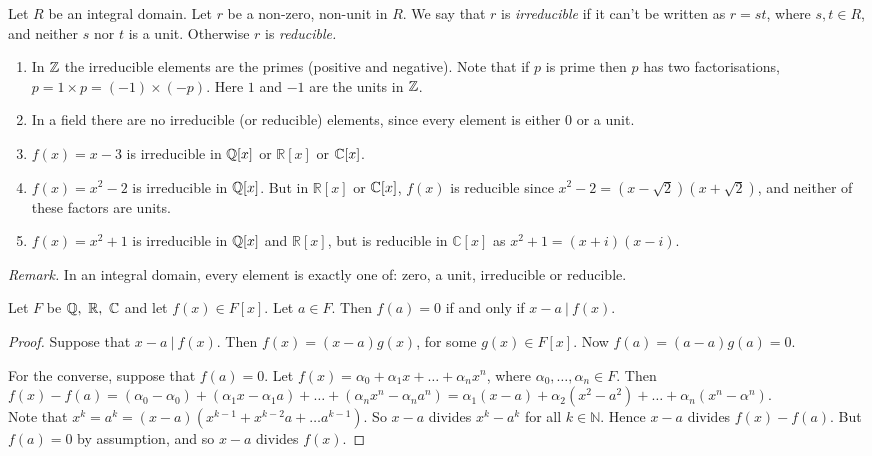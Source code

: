 \documentclass[10pt]{scrartcl}
\begin{document}
\begin{definition} Let $R$ be an integral domain. Let $r$ be a non-zero, non-unit in $R$. We say that $r$ is \emph{irreducible} if it can't be written as $r = st$, where $s,t \in R$, and neither $s$ nor $t$ is a unit. Otherwise $r$ is \emph{reducible.}	
\end{definition}
\vspace*{10pt}

\begin{examples}\begin{enumerate}
 \item In $\mathbb{Z}$ the irreducible elements are the primes (positive and negative). Note that if $p$ is prime then $p$ has two factorisations, $p = 1\times p = (-1) \times (-p)$. Here $1$ and $-1$ are the units in $\mathbb{Z}$.
 \item In a field there are no irreducible (or reducible) elements, since every element is either $0$ or a unit.
 \item $f(x) = x-3$ is irreducible in $\mathbb{Q}[x]$ or $\mathbb{R}[x]$ or $\mathbb{C}[x]$. %
 \item $f(x) = x^2 -2$ is irreducible in $\mathbb{Q}[x]$. But in $\mathbb{R}[x]$ or $\mathbb{C}[x]$, $f(x)$ is reducible since $x^2 - 2 = (x-\sqrt{2})(x + \sqrt{2})$, and neither of these factors are units.
 \item $f(x) = x^2 + 1$ is irreducible in $\mathbb{Q}[x]$ and $\mathbb{R}[x]$, but is reducible in $\mathbb{C}[x]$ as $x^2 + 1 = (x + i)(x -i)$.
 \end{enumerate}
 \end{examples}

 \textit{Remark.} In an integral domain, every element is exactly one of: zero, a unit, irreducible or reducible. \\

\begin{proposition} Let $F$ be $\mathbb{Q},~\mathbb{R},~\mathbb{C}$ and let $f(x) \in F[x]$. Let $a \in F$. Then $f(a) = 0$ if and only if $x -a ~|~ f(x).$	
\end{proposition}

\begin{proof}

Suppose that $x-a ~|~ f(x)$. Then $f(x) = (x-a)g(x)$, for some $g(x) \in F[x]$. Now $f(a) = (a-a)g(a) = 0$. \\ \vspace*{-5pt}

 For the converse, suppose that $f(a) = 0$. Let $f(x) = \alpha_0 + \alpha_1x + \dots + \alpha_nx^n$, where $\alpha_0, \dots, \alpha_n \in F$. Then $f(x) - f(a) = (\alpha_0 - \alpha_0) + (\alpha_1x -  \alpha_1a) + \dots +(\alpha_nx^n - \alpha_na^n)= \alpha_1(x-a) + \alpha_2(x^2 - a^2) + \dots + \alpha_n(x^n -\alpha^n).$ \\

Note that $x^k = a^k = (x-a)(x^{k-1}+ x^{k-2}a + \dots a^{k-1})$. So $x-a$ divides $x^k - a^k$ for all $k \in \mathbb{N}$. Hence $x-a$ divides $f(x) - f(a)$. But $f(a) = 0$ by assumption, and so $x-a$ divides $f(x)$.
\end{proof}
\end{document}
